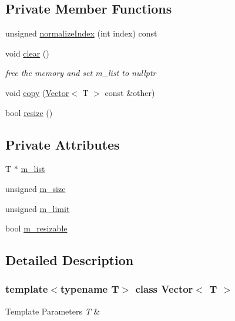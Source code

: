 \subsection*{Private Member Functions}
\begin{DoxyCompactItemize}
\item 
unsigned \hyperlink{classVector_a63f7ddd7328b13bc30b2243b50f70ec9}{normalize\+Index} (int index) const
\item 
void \hyperlink{classVector_a32ad98b135472b0ebc5d6cb3ae5d0085}{clear} ()
\begin{DoxyCompactList}\small\item\em free the memory and set m\+\_\+list to nullptr \end{DoxyCompactList}\item 
void \hyperlink{classVector_a13238db900a2c169c9fea56118fb33dd}{copy} (\hyperlink{classVector}{Vector}$<$ T $>$ const \&other)
\item 
bool \hyperlink{classVector_a4f139733691594adab6343c9647ad318}{resize} ()
\end{DoxyCompactItemize}
\subsection*{Private Attributes}
\begin{DoxyCompactItemize}
\item 
T $\ast$ \hyperlink{classVector_a6fa56a7d1cfb087e8caa82f071334e7c}{m\+\_\+list}
\item 
unsigned \hyperlink{classVector_a827694a58c1ed73287b2321de5ec433a}{m\+\_\+size}
\item 
unsigned \hyperlink{classVector_ae1d33e9478276ba3c9ecb5c1c9c19e51}{m\+\_\+limit}
\item 
bool \hyperlink{classVector_a99069135ae43a1ba51be987183079dc2}{m\+\_\+resizable}
\end{DoxyCompactItemize}


\subsection{Detailed Description}
\subsubsection*{template$<$typename T$>$\newline
class Vector$<$ T $>$}


\begin{DoxyTemplParams}{Template Parameters}
{\em T} & \\
\hline
\end{DoxyTemplParams}



